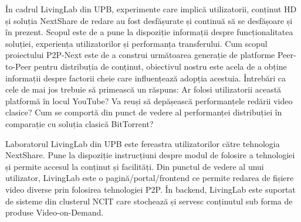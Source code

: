 În cadrul LivingLab din UPB, experimente care implică utilizatorii, conținut
HD și soluția NextShare de redare au fost desfășurate și continuă să se
desfășoare și în prezent. Scopul este de a pune la dispoziție informații despre
funcționalitatea soluției, experiența utilizatorilor și performanța transferului.
Cum scopul proiectului P2P-Next este de a construi următoarea generație de
platforme Peer-to-Peer pentru distribuția de conținut, obiectivul nostru este
acela de a obține informații despre factorii cheie care influențează adopția
acestuia. Întrebări ca cele de mai jos trebuie să primească un răspuns:
Ar folosi utilizatorii această platformă în locul YouTube? Va reuși să
depășească performanțele redării video clasice? Cum se comportă din punct de
vedere al performanței distribuției în comparație cu soluția clasică
BitTorrent?

Laboratorul LivingLab din UPB este fereastra utilizatorilor către tehnologia
NextShare. Pune la dispoziție instrucțiuni despre modul de folosire a
tehnologiei și permite accesul la conținut și facilități. Din punctul de
vedere al unui utilizator, LivingLab este o pagină/portal/frontend ce permite
redarea de fișiere video diverse prin folosirea tehnologiei P2P. În backend,
LivingLab este suportat de sisteme din clusterul NCIT care stochează și servesc
conținutul sub forma de produse Video-on-Demand.

